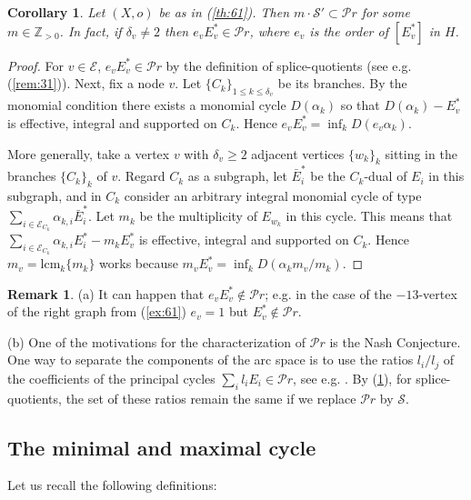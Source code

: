 \documentclass[10pt,a4paper]{amsart}
\numberwithin{equation}{section}
\numberwithin{equation}{subsection}
\theoremstyle{plain}
\newtheorem{corollary}[equation]{Corollary}
\theoremstyle{definition}
\newtheorem{remark}[equation]{Remark}
\begin{document}
\begin{corollary}\label{cor:62} Let $(X,o)$ be as in
(\ref{th:61}). Then $m\cdot {\mathcal{S}}'\subset {\mathcal Pr}$ for some $m\in
{\mathbb{Z}}_{>0}$. In fact, if $\delta_v\not=2$ then  $e_vE^*_v\in{\mathcal Pr}$,
where $e_v$ is the order of $[E^*_v]$ in $H$.
\end{corollary}
\begin{proof}
For $v\in{\mathcal{E}}$, $e_v E^*_v\in{\mathcal Pr}$ by the definition of
splice-quotients (see e.g. (\ref{rem:31})). 
Next, fix a node  $v$. Let $\{C_k\}_{1\leq k\leq
\delta_v}$ be its branches. By the monomial condition there exists
a monomial cycle $D(\alpha_{k})$ so that $D(\alpha_{k})-E^*_v$ is
effective, integral and supported on $C_k$. Hence
$e_vE^*_v=\inf_kD(e_v\alpha_{k})$.

More generally,  take a vertex $v$ with $\delta_v\geq 2$ adjacent
vertices $\{w_k\}_k$ sitting in the branches $\{C_k\}_k$ of $v$.
Regard $C_k$ as a subgraph, let $\bar{E}^*_i$ be the $C_k$-dual of
$E_i$ in this subgraph, and in $C_k$ consider an arbitrary
integral monomial cycle of type $\sum_{i\in
{\mathcal{E}}_{C_k}}\alpha_{k,i}\bar{E}^*_i$. Let $m_{k}$ be the
multiplicity of $E_{w_k}$ in this cycle. This means that
$\sum_{i\in{\mathcal{E}}_{C_k}}\alpha_{k,i}E^*_i-m_kE^*_v$ is effective,
integral and supported on $C_k$. Hence $m_v=\mathrm{lcm}_k\{m_k\}$
works because $m_vE^*_v=\inf_kD(\alpha_km_v/m_k)$.
\end{proof}

\begin{remark}\label{rem:61}
(a) It can happen that $e_vE^*_v\not\in{\mathcal Pr}$; e.g. in the case of
the $-13$-vertex of the right graph from (\ref{ex:61})  $e_v=1$
but $E^*_v\not\in{\mathcal Pr}$.

(b) One of the motivations for the characterization of ${\mathcal Pr}$ is
the Nash Conjecture. One way to separate the components of the arc
space is to use the ratios $l_i/l_j$ of the coefficients of the
principal cycles $\sum_il_iE_i\in {\mathcal Pr}$, see e.g. \cite{CaPl}. By
(\ref{cor:62}), for splice-quotients, the set of these ratios
remain the same if we replace ${\mathcal Pr}$ by ${\mathcal{S}}$.
\end{remark}

\subsection{The minimal and maximal cycle}\label{ss:MinMax}
Let us recall the following definitions:
\end{document}
